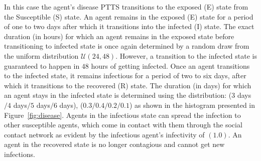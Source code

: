 \documentclass[doublespace,draft]{VTthesis}
\begin{document}
    In this case the agent's disease PTTS transitions to the exposed (E) state from the Susceptible (S) state. An agent remains in the exposed (E) state for a period of one to two days after which it transitions into the infected (I) state. The exact duration (in hours) for which an agent remains in the exposed state before transitioning to infected state is once again determined by a random draw from the uniform distribution $\mathcal{U}(24,48)$. However, a transition to the infected state is guaranteed to happen in $48$ hours of getting infected. Once an agent transitions to the infected state, it remains infectious for a period of two to six days, after which it transitions to the recovered (R) state. The duration (in days) for which an agent stays in the infected state is determined using the distribution: ($3$ days$/4$ days$/5$ days$/6$ days), ($0.3/0.4/0.2/0.1$) as shown in the histogram presented in Figure~\ref{fig:disease}. Agents in the infectious state can spread the infection to other susceptible agents, which come in contact with them through the social contact network as evident by the infectious agent's infectivity of $(1.0)$. An agent in the recovered state is no longer contagious and cannot get new infections.
    
\end{document}
